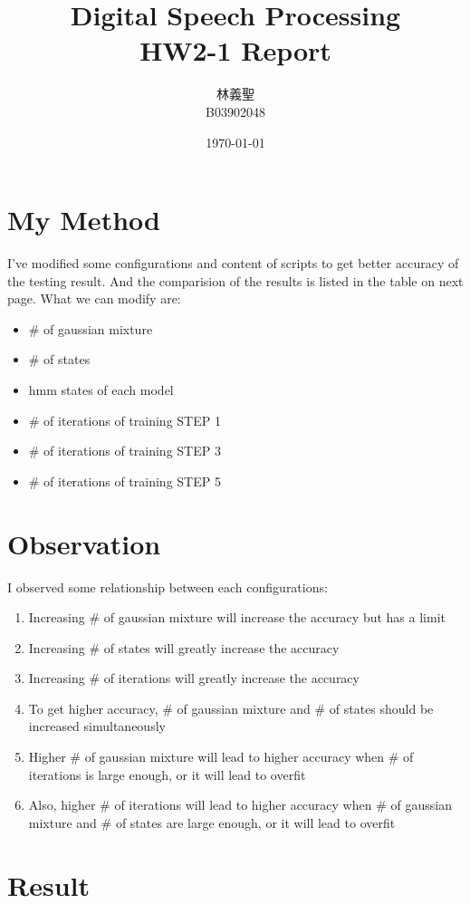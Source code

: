 \documentclass[12pt,a4paper]{extarticle}
\title{Digital Speech Processing\\HW2-1 Report\vspace{-1ex}}
\author{林義聖\\B03902048\vspace{-1ex}}
\date{\today\vspace{-1ex}}
\begin{document}
\maketitle
\thispagestyle{fancy}

\section*{My Method}

I've modified some configurations and content of scripts to get better accuracy of the testing result. And the comparision of the results is listed in the table on next page. What we can modify are:
\begin{itemize}
	\item \# of gaussian mixture
	\item \# of states
	\item hmm states of each model
	\item \# of iterations of training STEP 1
	\item \# of iterations of training STEP 3
	\item \# of iterations of training STEP 5
\end{itemize}

\section*{Observation}

I observed some relationship between each configurations:
\begin{enumerate}
	\item Increasing \# of gaussian mixture will increase the accuracy but has a limit
	\item Increasing \# of states will greatly increase the accuracy
	\item Increasing \# of iterations will greatly increase the accuracy
	\item To get higher accuracy, \# of gaussian mixture and \# of states should be increased simultaneously
	\item Higher \# of gaussian mixture will lead to higher accuracy when \# of iterations is large enough, or it will lead to overfit
	\item Also, higher \# of iterations will lead to higher accuracy when \# of gaussian mixture and \# of states are large enough, or it will lead to overfit
\end{enumerate}

\newpage

\section*{Result}
\end{document}
